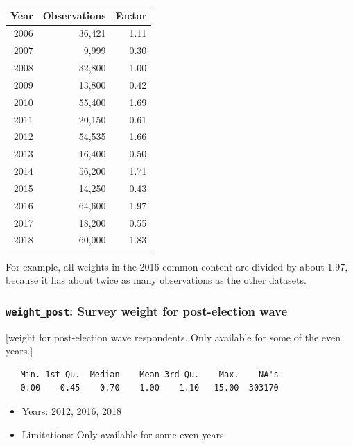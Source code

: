 \documentclass[10pt,article,oneside]{memoir}
\theoremstyle{definition}
\begin{document}
\begin{centering}


\begin{tabular}{rrr}
\toprule
Year & Observations & Factor\\
\midrule
2006 & 36,421 & 1.11\\
2007 & 9,999 & 0.30\\
2008 & 32,800 & 1.00\\
2009 & 13,800 & 0.42\\
2010 & 55,400 & 1.69\\
2011 & 20,150 & 0.61\\
2012 & 54,535 & 1.66\\
2013 & 16,400 & 0.50\\
2014 & 56,200 & 1.71\\
2015 & 14,250 & 0.43\\
2016 & 64,600 & 1.97\\
2017 & 18,200 & 0.55\\
2018 & 60,000 & 1.83\\
\bottomrule
\end{tabular}
\end{centering}

\smallskip

For example, all weights in the 2016 common content are divided by about
1.97, because it has about twice as many observations as the other
datasets.

\subsubsection{\texorpdfstring{\texttt{weight\_post}: Survey weight for
post-election
wave}{weight\_post: Survey weight for post-election wave}}\label{weight_post-survey-weight-for-post-election-wave}

{[}weight for post-election wave respondents. Only available for some of
the even years.{]}

\begin{verbatim}
   Min. 1st Qu.  Median    Mean 3rd Qu.    Max.    NA's 
   0.00    0.45    0.70    1.00    1.10   15.00  303170 
\end{verbatim}

\begin{itemize}
\tightlist
\item
  Years: 2012, 2016, 2018
\item
  Limitations: Only available for some even years.
\end{itemize}
\end{document}
